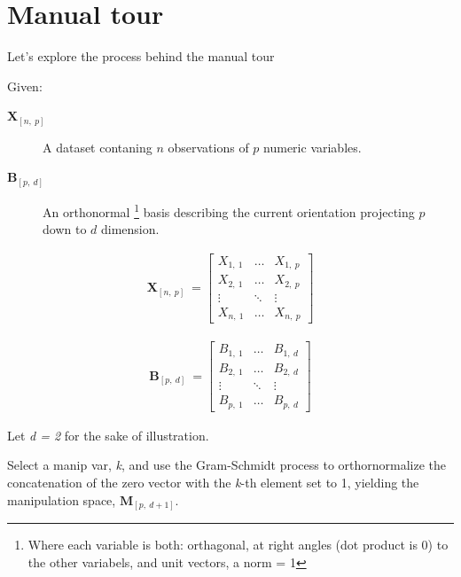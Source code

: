 \documentclass{monashthesis}
\begin{document}
\section{Manual tour}\label{manual-tour}

Let's explore the process behind the manual tour

Given:

\begin{description}
  \item[$\textbf{X}_{[n,~p]}$] A dataset contaning $n$ observations of $p$ numeric variables. 
  \item[$\textbf{B}_{[p,~d]}$] An orthonormal \footnote{Where each variable is both: orthagonal, at right angles (dot product is 0) to the other variabels, and unit vectors, a norm = 1} basis describing the current orientation projecting $p$ down to $d$ dimension.
\end{description}

\begin{align*}
  \textbf{X}_{[n,~p]} ~=
  \begin{bmatrix}
    X_{1,~1} & \dots  & X_{1,~p} \\
    X_{2,~1} & \dots  & X_{2,~p} \\
    \vdots   & \ddots & \vdots   \\
    X_{n,~1} & \dots  & X_{n,~p}
  \end{bmatrix}
\end{align*}

\begin{align*}
  \textbf{B}_{[p,~d]} ~=
  \begin{bmatrix}
    B_{1,~1} & \dots  & B_{1,~d} \\
    B_{2,~1} & \dots  & B_{2,~d} \\
    \vdots   & \ddots & \vdots   \\
    B_{p,~1} & \dots  & B_{p,~d}
  \end{bmatrix}
\end{align*}

Let \emph{d = 2} for the sake of illustration.

Select a manip var, \emph{k}, and use the Gram-Schmidt process to
orthornormalize the concatenation of the zero vector with the
\emph{k}-th element set to 1, yielding the manipulation space,
\(\textbf{M}_{[p,~d+1]}\).
\end{document}

